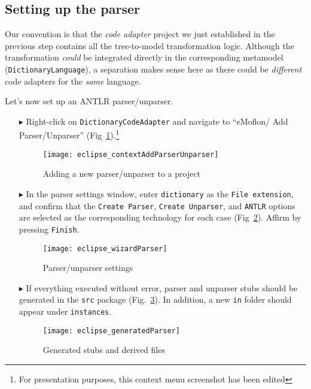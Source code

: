 \newpage
\hypertarget{subSec:setupParser}{}
\subsection{Setting up the parser}
\genHeader

Our convention is that the \emph{code adapter} project we just established in the previous step contains all the tree-to-model transformation logic. Although
the transformation \emph{could} be integrated directly in the corresponding metamodel (\texttt{Dic\-tion\-ary\-Language}), a separation makes sense here as
there could be \emph{different} code adapters for the \emph{same} language.

Let's now set up an ANTLR parser/unparser.

\begin{itemize}

\item[$\blacktriangleright$] Right-click on \texttt{DictionaryCodeAdapter} and navigate to ``eMoflon/ Add Parser/Unparser''
(Fig~\ref{eclipse:contextParser}).\footnote{For presentation purposes, this context menu screenshot has been edited}

\vspace{0.5cm}

\begin{figure}[htpb]
\begin{center}
  \texttt{[image: eclipse\_contextAddParserUnparser]}
  \caption{Adding a new parser/unparser to a project}
  \label{eclipse:contextParser}
\end{center}
\end{figure}


\item[$\blacktriangleright$] In the parser settings window, enter \texttt{dictionary} as the \texttt{File exten\-si\-on}, and confirm that the \texttt{Create
Parser}, \texttt{Create Unparser}, and \texttt{ANTLR} options are selected as the corresponding technology for each case (Fig~\ref{eclipse:wizardParser}).
Affirm by pressing \texttt{Finish}.

\begin{figure}[htpb]
\begin{center}
  \texttt{[image: eclipse\_wizardParser]}
  \caption{Parser/unparser settings}
  \label{eclipse:wizardParser}
\end{center}
\end{figure}


\item[$\blacktriangleright$] If everything executed without error, parser and unparser stubs should be generated in the \texttt{src} package
(Fig.~\ref{eclipse:generatedParser}). In addition, a new \texttt{in} folder should appear under \texttt{instances}.

\begin{figure}[htpb]
\begin{center}
  \texttt{[image: eclipse\_generatedParser]}
  \caption{Generated stubs and derived files}
  \label{eclipse:generatedParser}
\end{center}
\end{figure}

\end{itemize}
